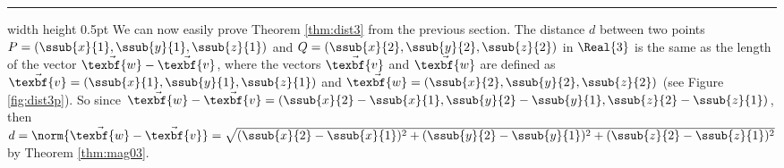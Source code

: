 \hrule width \textwidth height 0.5pt
\newpage
We can now easily prove Theorem \ref{thm:dist3} from the previous section. The distance $d$ between two
points $P = (\ssub{x}{1},\ssub{y}{1},\ssub{z}{1})$ and $Q = (\ssub{x}{2},\ssub{y}{2},\ssub{z}{2})$ in $\Real{3}$ is the
same as the length of the vector $\vec{\texbf{w}} - \vec{\texbf{v}}$, where the vectors $\vec{\texbf{v}}$ and $\vec{\texbf{w}}$ are
defined as $\vec{\texbf{v}} = (\ssub{x}{1},\ssub{y}{1},\ssub{z}{1})$
and $\vec{\texbf{w}} = (\ssub{x}{2},\ssub{y}{2},\ssub{z}{2})$ (see Figure \ref{fig:dist3p}). So since $\vec{\texbf{w}} -
\vec{\texbf{v}} = (\ssub{x}{2} - \ssub{x}{1},\ssub{y}{2} - \ssub{y}{1},\ssub{z}{2} - \ssub{z}{1})$, then
$d = \norm{\vec{\texbf{w}} - \vec{\texbf{v}}} = \sqrt{(\ssub{x}{2} - \ssub{x}{1})^2 + (\ssub{y}{2} - \ssub{y}{1})^2 +
(\ssub{z}{2} - \ssub{z}{1})^2}$ by Theorem \ref{thm:mag03}.

